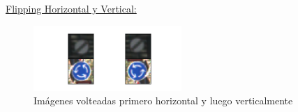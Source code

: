 \begin{multicols}{2}
\begin{figure}[H]
\begin{center}
				{\small{\fontsize{10}{16.8}\selectfont {Fuente: Elaboración propia}}}
					\end{center}
					\vspace{-1.5em}
				\end{figure}

			\end{multicols}

			\underline{Flipping Horizontal y Vertical:}
			\begin{figure}[H]
				\begin{center}
				\includegraphics[width=0.5\textwidth, height=0.25\textheight]{images/desarrollo/Augment/flippable_both}
				\end{center}
				\vspace{-1.em}
				\begin{center}
				\caption{\small{Imágenes volteadas primero horizontal y luego verticalmente}}
				{\small{\fontsize{10}{16.8}\selectfont {Fuente: Elaboración propia}}}
				\end{center}
				\vspace{-1.5em}
			\end{figure}

